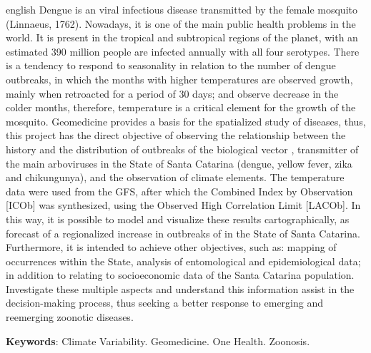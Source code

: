 \renewcommand{\baselinestretch}{1} 
\begin{resumo}[Abstract]
 \begin{otherlanguage*}{english}
 Dengue is an viral infectious disease transmitted by the female mosquito  (Linnaeus, 1762). Nowadays, it is one of the main public health problems in the world. It is present in the tropical and subtropical regions of the planet, with an estimated 390 million people are infected annually with all four serotypes. There is a tendency to respond to seasonality in relation to the number of dengue outbreaks, in which the months with higher temperatures are observed growth, mainly when retroacted for a period of 30 days; and observe decrease in the colder months, therefore, temperature is a critical element for the growth of the mosquito. Geomedicine provides a basis for the spatialized study of diseases, thus, this project has the direct objective of observing the relationship between the history and the distribution of outbreaks of the biological vector , transmitter of the main arboviruses in the State of Santa Catarina (dengue, yellow fever, zika and chikungunya), and the observation of climate elements. The temperature data were used from the \acrfull{GFS}, after which the Combined Index by Observation [\acrfull{ICOb}] was synthesized, using the Observed High Correlation Limit [\acrfull{LACOb}]. In this way, it is possible to model and visualize these results cartographically, as forecast of a regionalized increase in outbreaks of  in the State of Santa Catarina. Furthermore, it is intended to achieve other objectives, such as: mapping of occurrences within the State, analysis of entomological and epidemiological data; in addition to relating to socioeconomic data of the Santa Catarina population. Investigate these multiple aspects and understand this information assist in the decision-making process, thus seeking a better response to emerging and reemerging  zoonotic diseases. 

 
   \noindent 
   \textbf{Keywords}: Climate Variability. Geomedicine. One Health. Zoonosis.  
 \end{otherlanguage*}
\end{resumo}


